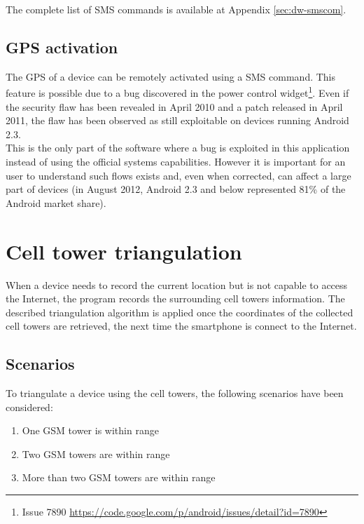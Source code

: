 The complete list of SMS commands is available at Appendix \ref{sec:dw-smscom}.

\subsection{GPS activation}
\label{sec:dw-gps-bug}

The GPS of a device can be remotely activated using a SMS command.
This feature is possible due to a bug discovered in the power control widget\footnote{Issue 7890 \url{https://code.google.com/p/android/issues/detail?id=7890}}.
Even if the security flaw has been revealed in April 2010 and a patch released in April 2011, the flaw has been observed as still exploitable on devices running Android 2.3.\\

This is the only part of the software where a bug is exploited in this application instead of using the official systems capabilities.
However it is important for an user to understand such flows exists and, even when corrected, can affect a large part of devices (in August 2012, Android 2.3 and below represented 81\% of the Android market share).


\section{Cell tower triangulation}

\label{sec:dw-cell-triangu}



When a device needs to record the current location but is not capable to access the Internet, the program records the surrounding cell towers information.
The described triangulation algorithm is applied once the coordinates of the collected cell towers are retrieved, the next time the smartphone is connect to the Internet.

\subsection{Scenarios}

To triangulate a device using the cell towers, the following scenarios have been considered:

\begin{enumerate}
\item One GSM tower is within range
\item Two GSM towers are within range
\item More than two GSM towers are within range
\end{enumerate}

